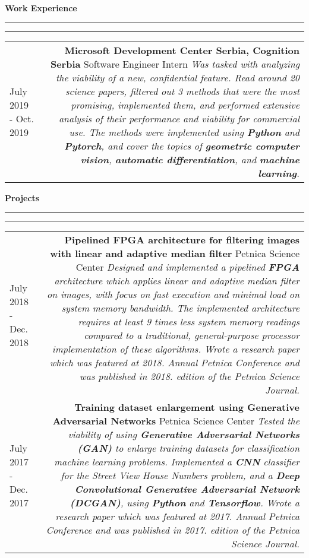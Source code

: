 \documentclass{article}
\newcommand{\mainitem}[3] {
    \textbf{#1}  \newline #2 \vskip5pt  \textit{#3} 
    \vspace{6pt}    %
}
\newenvironment{cvtable} {
	\hspace{-20pt} \begin{tabular}{L!{\color{line_color}\vrule width 1pt}D} %
} 
{\end{tabular}}
\renewcommand{\section}[1] {
    \vspace{15pt}   %
	{\color{main_color} \Large \textbf {#1}}
	{\color{line_color} \vskip-5pt \rule{\linewidth}{0.5mm}\hfill\vskip-11pt\rule{\linewidth}{0.2pt}}
	\vskip10pt  %
}
\begin{document}
    
    \section{Work Experience}
    	\begin{cvtable}
    	    \hspace{5pt} July 2019 - Oct. 2019  & 
    			\mainitem
    			    {Microsoft Development Center Serbia, Cognition Serbia}
    				{Software Engineer Intern} {
    				    Was tasked with analyzing the viability of a new, confidential feature.
    					Read around 20 science papers, filtered out 3 methods that were the most promising, implemented them, and performed extensive analysis of their performance and viability for commercial use. The methods were implemented using \textbf{Python} and \textbf{Pytorch}, and cover the topics of \textbf{geometric computer vision}, \textbf{automatic differentiation}, and \textbf{machine learning}.
    				}
    	\end{cvtable}
    
    \section{Projects}
    	\begin{cvtable}
    	    \hspace{5pt} July 2018 - Dec. 2018 & 
    			\mainitem
    			    {Pipelined FPGA architecture for filtering images with linear and adaptive median filter}
    			    {Petnica Science Center} 
    			    {
    			        Designed and implemented a pipelined \textbf{FPGA} architecture which applies linear and adaptive median filter on images, with focus on fast execution and minimal load on system memory bandwidth. The implemented architecture requires at least 9 times less system memory readings compared to a traditional, general-purpose processor implementation of these algorithms. Wrote a research paper which was featured at 2018. Annual Petnica Conference and was published in 2018. edition of the Petnica Science Journal.
                    } 
    	    \\
    		\hspace{5pt} July 2017 - Dec. 2017 & 
    			\mainitem
    			    {Training dataset enlargement using Generative Adversarial Networks}
    			    {Petnica Science Center} 
    			    {
    			        Tested the viability of using \textbf{Generative Adversarial Networks (GAN)} to enlarge training datasets for classification machine learning problems. Implemented a \textbf{CNN} classifier for the Street View House Numbers problem, and a \textbf{Deep Convolutional Generative Adversarial Network (DCGAN)}, using \textbf{Python} and \textbf{Tensorflow}. Wrote a research paper which was featured at 2017. Annual Petnica Conference and was published in 2017. edition of the Petnica Science Journal.
                    }
    	\end{cvtable}
    	
\end{document}
